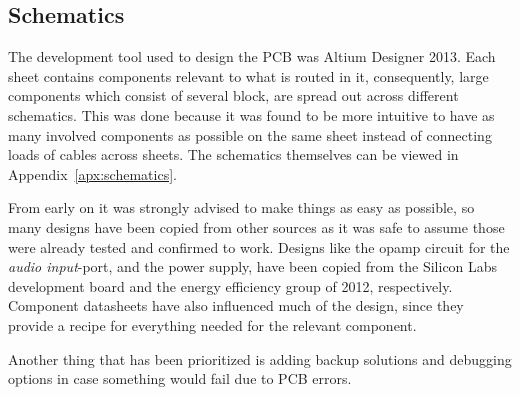 
\subsection{Schematics}

The development tool used to design the PCB was Altium Designer 2013. Each sheet
contains components relevant to what is routed in it, consequently, large
components which consist of several block, are spread out across different
schematics. This was done because it was found to be more  intuitive to have as
many involved components as possible on the same sheet instead of connecting
loads of cables across sheets. The schematics themselves can be viewed in
Appendix~\ref{apx:schematics}.

From early on it was strongly advised to make things as easy as possible, so
many designs have been copied from other sources as it was safe to assume those
were already tested and confirmed to work. Designs like the opamp circuit for
the \emph{audio input}-port, and the power supply, have been copied from the
Silicon Labs development board and the energy efficiency group of 2012,
respectively. Component datasheets have also influenced much of the design,
since they provide a recipe for everything needed for the relevant component.

Another thing that has been prioritized is adding backup solutions and debugging
options in case something would fail due to PCB errors. 
